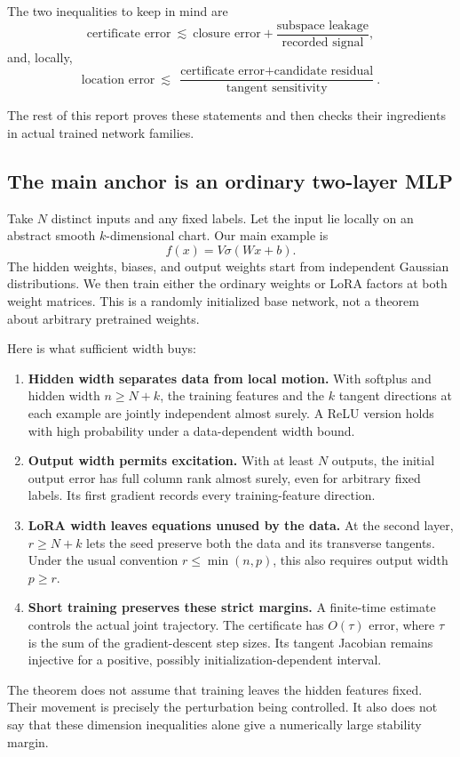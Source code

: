 \documentclass[12pt,a4paper]{article}
\theoremstyle{readable}
\theoremstyle{definition}\newtheorem{example}[theorem]{Example}
\begin{document}
\begin{minipage}{\linewidth}
The two inequalities to keep in mind are
\[
\text{certificate error}\ \lesssim\
\text{closure error}+\frac{\text{subspace leakage}}{\text{recorded signal}},
\]
and, locally,
\[
\text{location error}\ \lesssim\
\frac{\text{certificate error}+\text{candidate residual}}
{\text{tangent sensitivity}}.
\]
\end{minipage}
The rest of this report proves these statements and then checks their ingredients in actual trained network families.

\subsection{The main anchor is an ordinary two-layer MLP}
Take \(N\) distinct inputs and any fixed labels. Let the input lie locally on an abstract smooth \(k\)-dimensional chart. Our main example is
\[
f(x)=V\sigma(Wx+b).
\]
The hidden weights, biases, and output weights start from independent Gaussian distributions. We then train either the ordinary weights or LoRA factors at both weight matrices. This is a randomly initialized base network, not a theorem about arbitrary pretrained weights.

Here is what sufficient width buys:
\begin{enumerate}
\item \textbf{Hidden width separates data from local motion.} With softplus and hidden width \(n\ge N+k\), the training features and the \(k\) tangent directions at each example are jointly independent almost surely. A ReLU version holds with high probability under a data-dependent width bound.
\item \textbf{Output width permits excitation.} With at least \(N\) outputs, the initial output error has full column rank almost surely, even for arbitrary fixed labels. Its first gradient records every training-feature direction.
\item \textbf{LoRA width leaves equations unused by the data.} At the second layer, \(r\ge N+k\) lets the seed preserve both the data and its transverse tangents. Under the usual convention \(r\le\min(n,p)\), this also requires output width \(p\ge r\).
\item \textbf{Short training preserves these strict margins.} A finite-time estimate controls the actual joint trajectory. The certificate has \(O(\tau)\) error, where \(\tau\) is the sum of the gradient-descent step sizes. Its tangent Jacobian remains injective for a positive, possibly initialization-dependent interval.
\end{enumerate}
The theorem does not assume that training leaves the hidden features fixed. Their movement is precisely the perturbation being controlled. It also does not say that these dimension inequalities alone give a numerically large stability margin.
\end{document}
